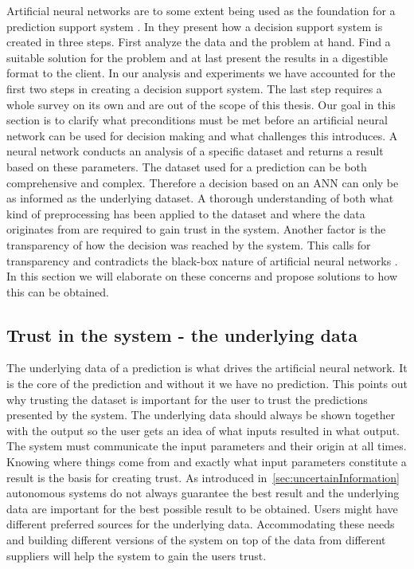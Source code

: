 Artificial neural networks are to some extent being used as the foundation for a prediction support system \cite{shim2002past}. In \cite{shim2002past} they present how a decision support system is created in three steps. First analyze the data and the problem at hand. Find a suitable solution for the problem and at last present the results in a digestible format to the client. In our analysis and experiments we have accounted for the first two steps in creating a decision support system. The last step requires a whole survey on its own and are out of the scope of this thesis. Our goal in this section is to clarify what preconditions must be met before an artificial neural network can be used for decision making and what challenges this introduces. A neural network conducts an analysis of a specific dataset and returns a result based on these parameters. The dataset used for a prediction can be both comprehensive and complex. Therefore a decision based on an ANN can only be as informed as the underlying dataset. A thorough understanding of both what kind of preprocessing has been applied to the dataset and where the data originates from are required to gain trust in the system. Another factor is the transparency of how the decision was reached by the system. This calls for transparency and contradicts the black-box nature of artificial neural networks \cite{fromBlackBoxToTransparentBox}. In this section we will elaborate on these concerns and propose solutions to how this can be obtained.

\subsection{Trust in the system - the underlying data}
The underlying data of a prediction is what drives the artificial neural network. It is the core of the prediction and without it we have no prediction. This points out why trusting the dataset is important for the user to trust the predictions presented by the system. The underlying data should always be shown together with the output so the user gets an idea of what inputs resulted in what output. The system must communicate the input parameters and their origin at all times. Knowing where things come from and exactly what input parameters constitute a result is the basis for creating trust. As introduced in~\ref{sec:uncertainInformation} autonomous systems do not always guarantee the best result and the underlying data are important for the best possible result to be obtained. Users might have different preferred sources for the underlying data. Accommodating these needs and building different versions of the system on top of the data from different suppliers will help the system to gain the users trust.

